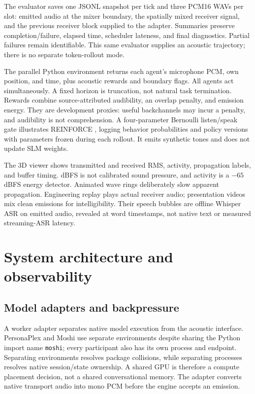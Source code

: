 \documentclass{article}
\newcommand{\code}[1]{\texttt{#1}}
\begin{document}
The evaluator saves one JSONL snapshot per tick and three PCM16 WAVs per slot: emitted audio at the mixer boundary, the spatially mixed receiver signal, and the previous receiver block supplied to the adapter. Summaries preserve completion/failure, elapsed time, scheduler lateness, and final diagnostics. Partial failures remain identifiable. This same evaluator supplies an acoustic trajectory; there is no separate token-rollout mode.

The parallel Python environment returns each agent's microphone PCM, own position, and time, plus acoustic rewards and boundary flags. All agents act simultaneously. A fixed horizon is truncation, not natural task termination. Rewards combine source-attributed audibility, an overlap penalty, and emission energy. They are development proxies: useful backchannels may incur a penalty, and audibility is not comprehension. A four-parameter Bernoulli listen/speak gate illustrates REINFORCE \citep{williams1992simple}, logging behavior probabilities and policy versions with parameters frozen during each rollout. It emits synthetic tones and does not update SLM weights.

The 3D viewer shows transmitted and received RMS, activity, propagation labels, and buffer timing. dBFS is not calibrated sound pressure, and activity is a $-65$ dBFS energy detector. Animated wave rings deliberately slow apparent propagation. Engineering replay plays actual receiver audio; presentation videos mix clean emissions for intelligibility. Their speech bubbles are offline Whisper ASR on emitted audio, revealed at word timestamps, not native text or measured streaming-ASR latency.

\section{System architecture and observability}
\subsection{Model adapters and backpressure}
A worker adapter separates native model execution from the acoustic interface. PersonaPlex and Moshi use separate environments despite sharing the Python import name \code{moshi}; every participant also has its own process and endpoint. Separating environments resolves package collisions, while separating processes resolves native session/state ownership. A shared GPU is therefore a compute placement decision, not a shared conversational memory. The adapter converts native transport audio into mono PCM before the engine accepts an emission.
\end{document}
